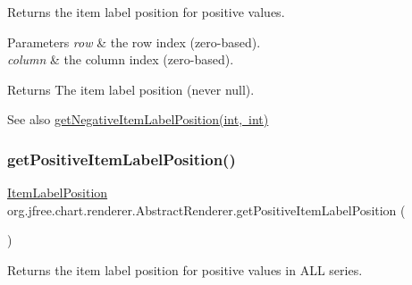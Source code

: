 Returns the item label position for positive values.


\begin{DoxyParams}{Parameters}
{\em row} & the row index (zero-\/based). \\
\hline
{\em column} & the column index (zero-\/based).\\
\hline
\end{DoxyParams}
\begin{DoxyReturn}{Returns}
The item label position (never {\ttfamily null}).
\end{DoxyReturn}
\begin{DoxySeeAlso}{See also}
\mbox{\hyperlink{classorg_1_1jfree_1_1chart_1_1renderer_1_1_abstract_renderer_ade5ebf7f08f0b93908ac4b1eb0099902}{get\+Negative\+Item\+Label\+Position(int, int)}} 
\end{DoxySeeAlso}
\mbox{\label{classorg_1_1jfree_1_1chart_1_1renderer_1_1_abstract_renderer_a2a9b96ccec98379882ae3c8a24e09261}} 
\subsubsection{\texorpdfstring{get\+Positive\+Item\+Label\+Position()}{getPositiveItemLabelPosition()}\hspace{0.1cm}{\footnotesize\ttfamily [2/2]}}
{\footnotesize\ttfamily \mbox{\hyperlink{classorg_1_1jfree_1_1chart_1_1labels_1_1_item_label_position}{Item\+Label\+Position}} org.\+jfree.\+chart.\+renderer.\+Abstract\+Renderer.\+get\+Positive\+Item\+Label\+Position (\begin{DoxyParamCaption}{ }\end{DoxyParamCaption})}

Returns the item label position for positive values in A\+LL series.

